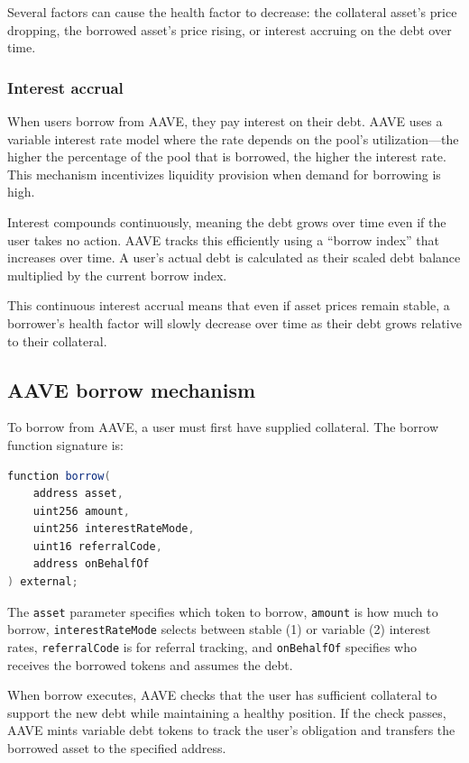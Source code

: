 Several factors can cause the health factor to decrease: the collateral asset's price dropping, the borrowed asset's price rising, or interest accruing on the debt over time.

\subsubsection{Interest accrual}

When users borrow from AAVE, they pay interest on their debt. AAVE uses a variable interest rate model where the rate depends on the pool's utilization---the higher the percentage of the pool that is borrowed, the higher the interest rate. This mechanism incentivizes liquidity provision when demand for borrowing is high.

Interest compounds continuously, meaning the debt grows over time even if the user takes no action. AAVE tracks this efficiently using a ``borrow index'' that increases over time. A user's actual debt is calculated as their scaled debt balance multiplied by the current borrow index.

This continuous interest accrual means that even if asset prices remain stable, a borrower's health factor will slowly decrease over time as their debt grows relative to their collateral.

\subsection{AAVE borrow mechanism}

To borrow from AAVE, a user must first have supplied collateral. The borrow function signature is:

\begin{lstlisting}[language=Java,caption={AAVE Pool borrow function},label=lst:pool-borrow]
function borrow(
    address asset,
    uint256 amount,
    uint256 interestRateMode,
    uint16 referralCode,
    address onBehalfOf
) external;
\end{lstlisting}

The \texttt{asset} parameter specifies which token to borrow, \texttt{amount} is how much to borrow, \texttt{interestRateMode} selects between stable (1) or variable (2) interest rates, \texttt{referralCode} is for referral tracking, and \texttt{onBehalfOf} specifies who receives the borrowed tokens and assumes the debt.

When borrow executes, AAVE checks that the user has sufficient collateral to support the new debt while maintaining a healthy position. If the check passes, AAVE mints variable debt tokens to track the user's obligation and transfers the borrowed asset to the specified address.

